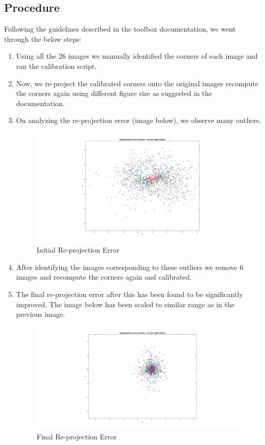 \documentclass[10pt,a4paper]{article}
\begin{document}
		\subsection{Procedure}
		Following the guidelines described in the toolbox documentation, we went through the below steps:
			\begin{enumerate}
				\item Using all the 26 images we manually identified the corners of each image and ran the calibration script.
				\item Now, we re-project the calibrated corners onto the original images recompute the corners again using different figure size as suggested in the documentation.
				\item On analyzing the re-projection error (image below), we observe many outliers.
					\begin{figure}[h]
						\centering
						\includegraphics[scale=0.2]{images/analyze_error_initial.jpg}
						\caption{Initial Re-projection Error}
					\end{figure}
				\item After identifying the images corresponding to these outliers we remove 6 images and recompute the corners again and calibrated.
				\item The final re-projection error after this has been found to be significantly improved. The image below has been scaled to similar range as in the previous image.		
					\begin{figure}[h]
						\centering
						\includegraphics[scale=0.2]{images/analyze_error_final.jpg}
						\caption{Final Re-projection Error}
					\end{figure}		
			\end{enumerate}			
\end{document}

